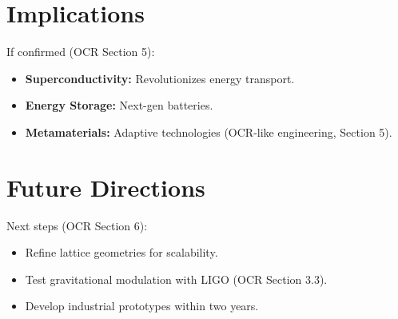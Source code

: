 \documentclass{article}
\begin{document}
\section{Implications}
If confirmed (OCR Section 5):
\begin{itemize}
    \item \textbf{Superconductivity:} Revolutionizes energy transport.
    \item \textbf{Energy Storage:} Next-gen batteries.
    \item \textbf{Metamaterials:} Adaptive technologies (OCR-like engineering, Section 5).
\end{itemize}

\section{Future Directions}
Next steps (OCR Section 6):
\begin{itemize}
    \item Refine lattice geometries for scalability.
    \item Test gravitational modulation with LIGO (OCR Section 3.3).
    \item Develop industrial prototypes within two years.
\end{itemize}
\end{document}
